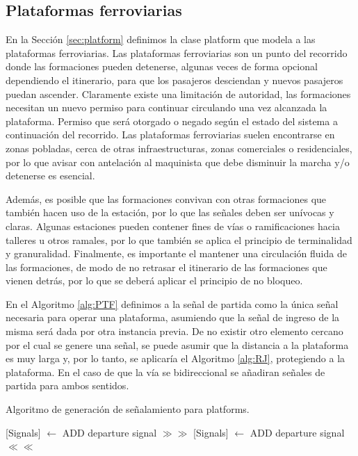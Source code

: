 \subsection{Plataformas ferroviarias}


    En la Sección \ref{sec:platform} definimos la clase platform que modela a las plataformas ferroviarias. Las plataformas ferroviarias son un punto del recorrido donde las formaciones pueden detenerse, algunas veces de forma opcional dependiendo el itinerario, para que los pasajeros desciendan y nuevos pasajeros puedan ascender. Claramente existe una limitación de autoridad, las formaciones necesitan un nuevo permiso para continuar circulando una vez alcanzada la plataforma. Permiso que será otorgado o negado según el estado del sistema a continuación del recorrido. Las plataformas ferroviarias suelen encontrarse en zonas pobladas, cerca de otras infraestructuras, zonas comerciales o residenciales, por lo que avisar con antelación al maquinista que debe disminuir la marcha y/o detenerse es esencial.

    Además, es posible que las formaciones convivan con otras formaciones que también hacen uso de la estación, por lo que las señales deben ser unívocas y claras. Algunas estaciones pueden contener fines de vías o ramificaciones hacia talleres u otros ramales, por lo que también se aplica el principio de terminalidad y granuralidad. Finalmente, es importante el mantener una circulación fluida de las formaciones, de modo de no retrasar el itinerario de las formaciones que vienen detrás, por lo que se deberá aplicar el principio de no bloqueo.

    En el Algoritmo \ref{alg:PTF} definimos a la señal de partida como la única señal necesaria para operar una plataforma, asumiendo que la señal de ingreso de la misma será dada por otra instancia previa. De no existir otro elemento cercano por el cual se genere una señal, se puede asumir que la distancia a la plataforma es muy larga y, por lo tanto, se aplicaría el Algoritmo \ref{alg:RJ}, protegiendo a la plataforma. En el caso de que la vía se bidireccional se añadiran señales de partida para ambos sentidos.

    \begin{algorithm}[hbt!]
        \caption{Algoritmo de generación de señalamiento para platforms.}\label{alg:PTF}
        \DontPrintSemicolon
        \SetNoFillComment
        \LinesNotNumbered 
        {
            [Signals] $\gets$ ADD departure signal $\gg\gg$\;
            [Signals] $\gets$ ADD departure signal $\ll\ll$\;
        }
        \KwResult{[Signals]} 
    \end{algorithm}

